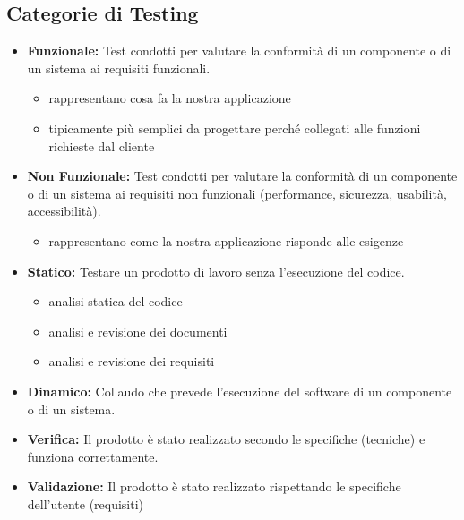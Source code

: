 \subsection{Categorie di Testing}
\begin{itemize}
    \item \textbf{Funzionale:} Test condotti per valutare la conformità di un componente o di un sistema ai requisiti funzionali.
    \begin{itemize}
        \item rappresentano cosa fa la nostra applicazione
        \item tipicamente più semplici da progettare perché collegati alle funzioni richieste dal cliente
    \end{itemize}
    \item \textbf{Non Funzionale:} Test condotti per valutare la conformità di un componente o di un sistema ai requisiti non funzionali (performance, sicurezza, usabilità, accessibilità).
    \begin{itemize}
        \item rappresentano come la nostra applicazione risponde alle esigenze
    \end{itemize}
    \item \textbf{Statico:} Testare un prodotto di lavoro senza l'esecuzione del codice.
    \begin{itemize}
        \item analisi statica del codice
        \item analisi e revisione dei documenti
        \item analisi e revisione dei requisiti
    \end{itemize}
    \item \textbf{Dinamico:} Collaudo che prevede l'esecuzione del software di un componente o di un sistema.
    \item \textbf{Verifica:} Il prodotto è stato realizzato secondo le specifiche (tecniche) e funziona correttamente.
    \item \textbf{Validazione:} Il prodotto è stato realizzato rispettando le specifiche dell'utente (requisiti)
\end{itemize}

